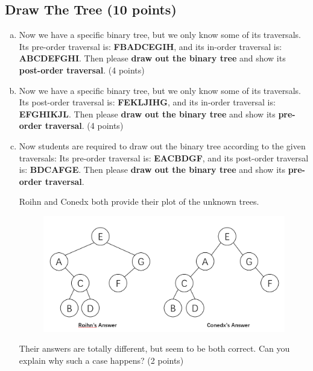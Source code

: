 \documentclass[11pt]{exam}
\begin{document}
\subsection{Draw The Tree (10 points)}
\begin{enumerate}[a)]
\item Now we have a specific binary tree, but we only know some of its traversals. Its pre-order traversal is: \textbf{FBADCEGIH}, and its in-order traversal is: \textbf{ABCDEFGHI}. Then please \textbf{draw out the binary tree} and show its \textbf{post-order traversal}. (4 points)

\begin{solution}
\end{solution}

\item Now we have a specific binary tree, but we only know some of its traversals. Its post-order traversal is: \textbf{FEKLJIHG}, and its in-order traversal is: \textbf{EFGHIKJL}. Then please \textbf{draw out the binary tree} and show its \textbf{pre-order traversal}. (4 points)

\begin{solution}
\end{solution}

\item Now students are required to draw out the binary tree according to the given traversals: Its pre-order traversal is: \textbf{EACBDGF}, and its post-order traversal is: \textbf{BDCAFGE}. Then please \textbf{draw out the binary tree} and show its \textbf{pre-order traversal}.

Roihn and Conedx both provide their plot of the unknown trees. 
\begin{figure}[H]
\centering
\includegraphics[width=.8\linewidth]{two_ans.png}
\end{figure}

Their answers are totally different, but seem to be both correct. Can you explain why such a case happens? (2 points)

\begin{solution}
\end{solution}

\end{enumerate}
\end{document}

